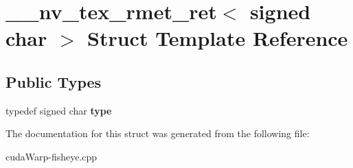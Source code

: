 \hypertarget{struct____nv__tex__rmet__ret_3_01signed_01char_01_4}{}\section{\+\_\+\+\_\+nv\+\_\+tex\+\_\+rmet\+\_\+ret$<$ signed char $>$ Struct Template Reference}
\label{struct____nv__tex__rmet__ret_3_01signed_01char_01_4}
\subsection*{Public Types}
\begin{DoxyCompactItemize}
\item 
typedef signed char {\bfseries type}\hypertarget{struct____nv__tex__rmet__ret_3_01signed_01char_01_4_a703f868b9c2566bff49f281e41a34afe}{}\label{struct____nv__tex__rmet__ret_3_01signed_01char_01_4_a703f868b9c2566bff49f281e41a34afe}

\end{DoxyCompactItemize}


The documentation for this struct was generated from the following file\+:\begin{DoxyCompactItemize}
\item 
cuda\+Warp-\/fisheye.\+cpp\end{DoxyCompactItemize}
